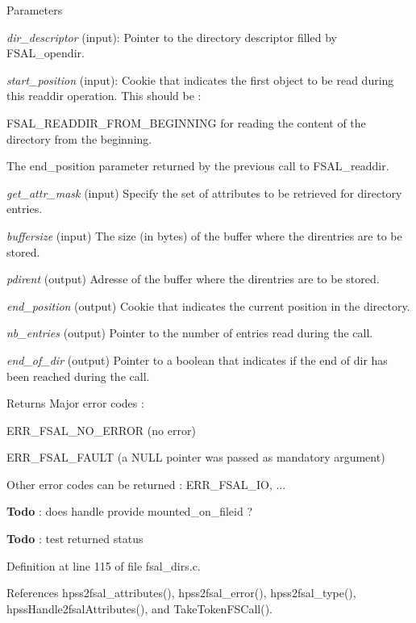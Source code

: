 \begin{DoxyParams}{Parameters}
\item[{\em dir\_\-descriptor}](input): Pointer to the directory descriptor filled by FSAL\_\-opendir. \item[{\em start\_\-position}](input): Cookie that indicates the first object to be read during this readdir operation. This should be :
\begin{DoxyItemize}
\item FSAL\_\-READDIR\_\-FROM\_\-BEGINNING for reading the content of the directory from the beginning.
\item The end\_\-position parameter returned by the previous call to FSAL\_\-readdir. 
\end{DoxyItemize}\item[{\em get\_\-attr\_\-mask}](input) Specify the set of attributes to be retrieved for directory entries. \item[{\em buffersize}](input) The size (in bytes) of the buffer where the direntries are to be stored. \item[{\em pdirent}](output) Adresse of the buffer where the direntries are to be stored. \item[{\em end\_\-position}](output) Cookie that indicates the current position in the directory. \item[{\em nb\_\-entries}](output) Pointer to the number of entries read during the call. \item[{\em end\_\-of\_\-dir}](output) Pointer to a boolean that indicates if the end of dir has been reached during the call.\end{DoxyParams}
\begin{DoxyReturn}{Returns}
Major error codes :
\begin{DoxyItemize}
\item ERR\_\-FSAL\_\-NO\_\-ERROR (no error)
\item ERR\_\-FSAL\_\-FAULT (a NULL pointer was passed as mandatory argument)
\item Other error codes can be returned : ERR\_\-FSAL\_\-IO, ... 
\end{DoxyItemize}
\end{DoxyReturn}


\begin{Desc}
\item[{\bf Todo}]: does handle provide mounted\_\-on\_\-fileid ? \end{Desc}


\begin{Desc}
\item[{\bf Todo}]: test returned status \end{Desc}


Definition at line 115 of file fsal\_\-dirs.c.

References hpss2fsal\_\-attributes(), hpss2fsal\_\-error(), hpss2fsal\_\-type(), hpssHandle2fsalAttributes(), and TakeTokenFSCall().